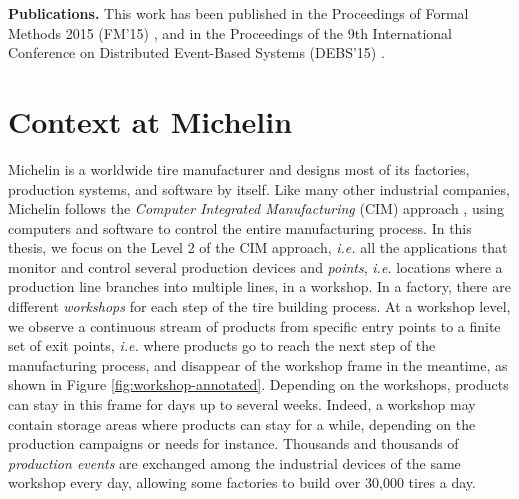 \textbf{Publications.} This work has been published in the
Proceedings of Formal Methods 2015 (FM'15)
\cite{DBLP:conf/fm/DurandS15}, and in the Proceedings of the 9th
International Conference on Distributed Event-Based Systems
(DEBS'15) \cite{DBLP:conf/debs/SalvaD15}.

\section{Context at Michelin}
\label{prodsys:context}

Michelin is a worldwide tire manufacturer and designs most of its
factories, production systems, and software by itself.  Like
many other industrial companies, Michelin follows the \emph{Computer
Integrated Manufacturing} (CIM) approach \cite{rehg2004computer},
using computers and software to control the entire manufacturing
process. In this thesis, we focus on the Level 2 of the CIM
approach, \emph{i.e.} all the applications that monitor and control
several production devices and \emph{points}, \emph{i.e.}
locations where a production line branches into multiple lines,
in a workshop. In a factory, there are different \emph{workshops}
for each step of the tire building process. At a workshop level,
we observe a continuous stream of products from specific entry
points to a finite set of exit points, \emph{i.e.} where products
go to reach the next step of the manufacturing process, and
disappear of the workshop frame in the meantime, as shown in
Figure \ref{fig:workshop-annotated}.  Depending on the workshops,
products can stay in this frame for days up to several weeks.
Indeed, a workshop may contain storage areas where products can
stay for a while, depending on the production campaigns or needs
for instance.  Thousands and thousands of \emph{production
events} are exchanged among the industrial devices of the same
workshop every day, allowing some factories to build over 30,000
tires a day.

